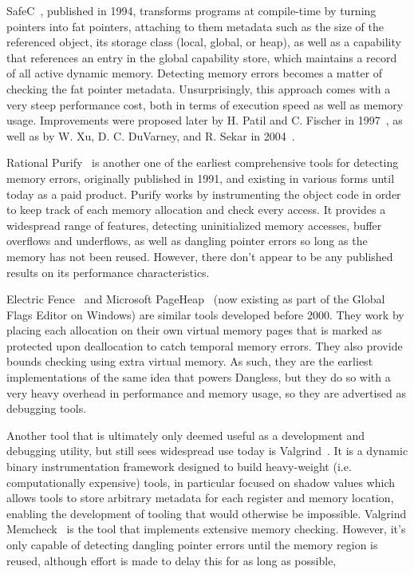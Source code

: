SafeC~\cite{safec1994}, published in 1994, transforms programs at compile-time by turning pointers into fat pointers, attaching to them metadata such as the size of the referenced object, its storage class (local, global, or heap), as well as a capability that references an entry in the global capability store, which maintains a record of all active dynamic memory. Detecting memory errors becomes a matter of checking the fat pointer metadata. Unsurprisingly, this approach comes with a very steep performance cost, both in terms of execution speed as well as memory usage. Improvements were proposed later by H. Patil and C. Fischer in 1997~\cite{safec-improved1997}, as well as by W. Xu, D. C. DuVarney, and R. Sekar in 2004~\cite{safec-improved2004}.

Rational Purify~\cite{hastings1991purify} is another one of the earliest comprehensive tools for detecting memory errors, originally published in 1991, and existing in various forms until today as a paid product. Purify works by instrumenting the object code in order to keep track of each memory allocation and check every access. It provides a widespread range of features, detecting uninitialized memory accesses, buffer overflows and underflows, as well as dangling pointer errors so long as the memory has not been reused. However, there don't appear to be any published results on its performance characteristics.

Electric Fence~\cite{electric-fence} and Microsoft PageHeap~\cite{pageheap} (now existing as part of the Global Flags Editor on Windows) are similar tools developed before 2000. They work by placing each allocation on their own virtual memory pages that is marked as protected upon deallocation to catch temporal memory errors. They also provide bounds checking using extra virtual memory. As such, they are the earliest implementations of the same idea that powers Dangless, but they do so with a very heavy overhead in performance and memory usage, so they are advertised as debugging tools.

Another tool that is ultimately only deemed useful as a development and debugging utility, but still sees widespread use today is Valgrind~\cite{valgrind2007}. It is a dynamic binary instrumentation framework designed to build heavy-weight (i.e. computationally expensive) tools, in particular focused on shadow values which allows tools to store arbitrary metadata for each register and memory location, enabling the development of tooling that would otherwise be impossible. Valgrind Memcheck~\cite{valgrind-memcheck-web} is the tool that implements extensive memory checking. However, it's only capable of detecting dangling pointer errors until the memory region is reused, although effort is made to delay this for as long as possible,

